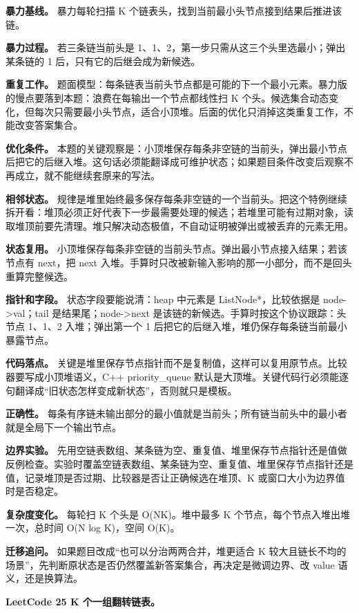 \textbf{暴力基线。} 暴力每轮扫描 K 个链表头，找到当前最小头节点接到结果后推进该链。

\textbf{暴力过程。} 若三条链当前头是 1、1、2，第一步只需从这三个头里选最小；弹出某条链的 1 后，只有它的后继会成为新候选。

\textbf{重复工作。} 题面模型：每条链表当前头节点都是可能的下一个最小元素。暴力版的慢点要落到本题：浪费在每输出一个节点都线性扫 K 个头。候选集合动态变化，但每次只需要最小头节点，适合小顶堆。后面的优化只消掉这类重复工作，不能改变答案集合。

\textbf{优化条件。} 本题的关键观察是：小顶堆保存每条非空链的当前头，弹出最小节点后把它的后继入堆。这句话必须能翻译成可维护状态；如果题目条件改变后观察不再成立，就不能继续套原来的写法。

\textbf{相邻状态。} 规律是堆里始终最多保存每条非空链的一个当前头。把这个特例继续拆开看：堆顶必须正好代表下一步最需要处理的候选；若堆里可能有过期对象，读取堆顶前要先清理。堆只解决动态极值，不自动证明被弹出或被丢弃的元素无用。

\textbf{状态复用。} 小顶堆保存每条非空链的当前头节点。弹出最小节点接入结果；若该节点有 next，把 next 入堆。手算时只改被新输入影响的那一小部分，而不是回头重算完整候选。

\textbf{指针和字段。} 状态字段要能说清：heap 中元素是 ListNode*，比较依据是 node->val；tail 是结果尾；node->next 是该链的新候选。手算时按这个协议跟踪：头节点 1、1、2 入堆；弹出第一个 1 后把它的后继入堆，堆仍保存每条链当前最小暴露节点。

\textbf{代码落点。} 关键是堆里保存节点指针而不是复制值，这样可以复用原节点。比较器要写成小顶堆语义，C++ priority\_queue 默认是大顶堆。关键代码行必须能逐句翻译成“旧状态怎样变成新状态”，否则就只是模板。

\textbf{正确性。} 每条有序链未输出部分的最小值就是当前头；所有链当前头中的最小者就是全局下一个输出节点。

\textbf{边界实验。} 先用空链表数组、某条链为空、重复值、堆里保存节点指针还是值做反例检查。实验时覆盖空链表数组、某条链为空、重复值、堆里保存节点指针还是值，记录堆顶是否过期、比较器是否让正确候选在堆顶、K 或窗口大小为边界值时是否稳定。

\textbf{复杂度变化。} 每轮扫 K 个头是 O(NK)。堆中最多 K 个节点，每个节点入堆出堆一次，总时间 O(N log K)，空间 O(K)。

\textbf{迁移追问。} 如果题目改成“也可以分治两两合并，堆更适合 K 较大且链长不均的场景”，先判断原状态是否仍然覆盖新答案集合，再决定是微调边界、改 value 语义，还是换算法。

\noindent\textbf{LeetCode 25 K 个一组翻转链表。}

